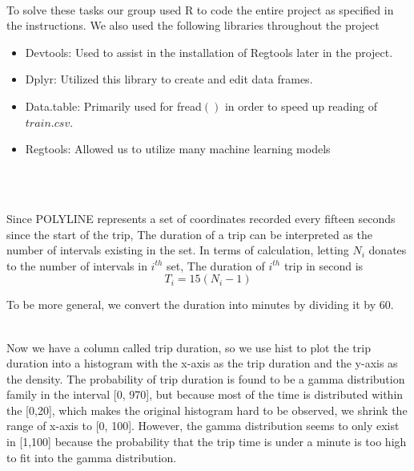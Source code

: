\documentclass[11pt]{article}
\begin{document}
\\
\par To solve these tasks our group used R to code the entire project as specified in the instructions.
 We also used the following libraries throughout the project

\begin{itemize}
	\item Devtools: Used to assist in the installation of Regtools later in the project.
	\item Dplyr: Utilized this library to create and edit data frames.
	\item Data.table: Primarily used for fread$()$ in order to speed up reading of \(train.csv\).
	\item Regtools: Allowed us to utilize many machine learning models
\end{itemize}

\\ 
\\
\par
Since POLYLINE represents a set of coordinates recorded every fifteen seconds since the start of the trip,
 The duration of a trip can be interpreted as the number of intervals existing in the set. In terms of calculation,
 letting $N_i$ donates to the number of intervals in $i^{th}$ set, The duration of $i^{th}$ trip in second is
\begin{equation}
T_i = 15(N_i -1)
\end{equation}
\par
To be more general, we convert the duration into minutes by dividing it by 60.\\

\\
\par
Now we have a column called trip duration, so we use hist to plot the trip duration into a histogram with the x-axis
 as the trip duration and the y-axis as the density. The probability of trip duration is found to be a gamma
 distribution family in the interval [0, 970], but because most of the time is distributed within the [0,20],
 which makes the original histogram hard to be observed, we shrink the range of x-axis to [0, 100]. However,
 the gamma distribution seems to only exist in [1,100] because the probability that the trip time is under a minute
 is too high to fit into the gamma distribution.
\end{document}
